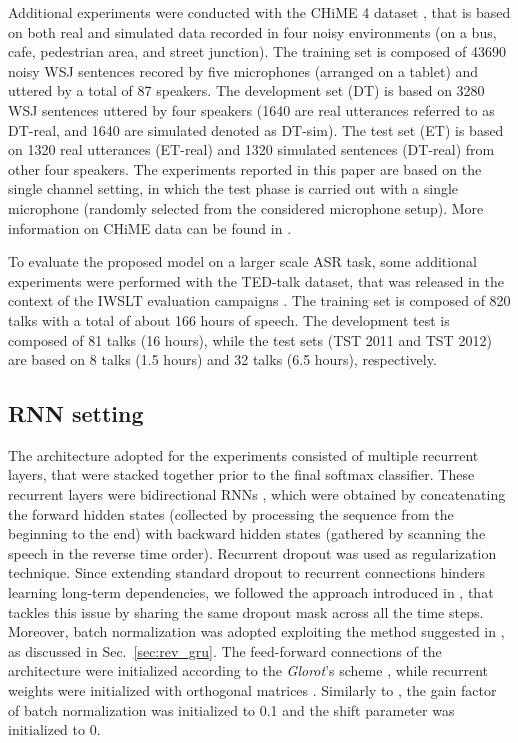 \documentclass[journal]{IEEEtran}
\begin{document}
Additional experiments were conducted with the CHiME 4 dataset \cite{chime4_paper}, that is based on both real and simulated data recorded in four noisy environments (on a bus, cafe, pedestrian area, and street junction). The training set is composed of 43690 noisy WSJ sentences recored by five microphones (arranged on a tablet) and uttered by a total of 87 speakers. The development set (DT) is based on 3280 WSJ sentences uttered by four speakers (1640 are real utterances referred to as DT-real, and 1640 are simulated denoted as DT-sim). 
The test set (ET) is based on  1320 real utterances (ET-real) and 1320 simulated sentences (DT-real) from other four speakers. The experiments reported in this paper are based on the single channel setting, in which the test phase is carried out with a single microphone (randomly selected from the considered microphone setup). 
More information on CHiME data can be found in \cite{chime3}.

To evaluate the proposed model on a larger scale ASR task, some  additional experiments were performed with the TED-talk dataset, that was released in the context of the IWSLT evaluation campaigns \cite{iwslt_2011}. The training set is composed of 820 talks with a total of about 166 hours of speech. The development test is composed of 81 talks (16 hours), while the test sets (TST 2011 and TST 2012) are based on 8 talks (1.5 hours) and 32 talks (6.5 hours), respectively.



\subsection{RNN setting} \label{sec:rnn_setup}
The architecture adopted for the experiments consisted of multiple recurrent layers, that were stacked together prior to the final softmax classifier. These recurrent layers were bidirectional RNNs \cite{graves}, which were obtained by concatenating the forward hidden states (collected by processing the sequence from the beginning to the end) with backward hidden states (gathered by scanning the speech in the reverse time order).
Recurrent dropout was used as regularization technique. Since extending standard dropout to recurrent connections hinders learning long-term dependencies, we followed the approach introduced in \cite{drop_asru,Gal2016}, that tackles this issue by sharing the same dropout mask across all the time steps. Moreover,  batch normalization was adopted exploiting the method suggested in \cite{cesar}, as discussed in Sec.~\ref{sec:rev_gru}.
The feed-forward connections of the architecture were initialized according to the \textit{Glorot}'s scheme \cite{xavier}, while recurrent weights were initialized with orthogonal matrices \cite{orth_init}. Similarly to \cite{ravanelli_SLT}, the gain factor  of batch normalization was initialized to 0.1 and the shift parameter  was initialized to 0.
\end{document}
